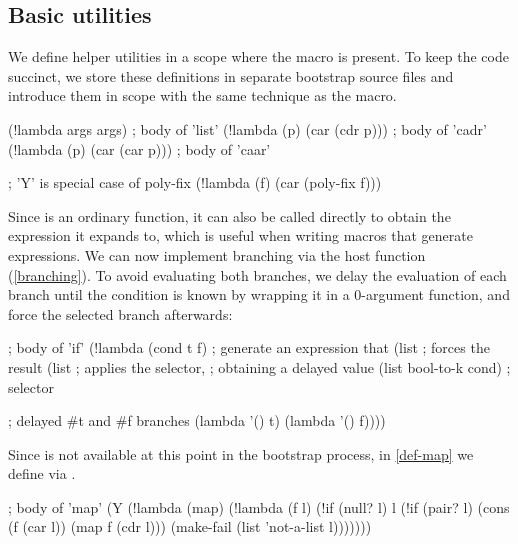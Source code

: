 \subsection{Basic utilities}
We define helper utilities in a scope where the  macro is present.
To keep the code succinct, we store these definitions in separate bootstrap
source files and introduce them in scope with the same technique as the
 macro.
\begin{listingbox}\begin{ildcode}
(!lambda args args)         ; body of 'list'
(!lambda (p) (car (cdr p))) ; body of 'cadr'
(!lambda (p) (car (car p))) ; body of 'caar'

; 'Y' is special case of poly-fix
(!lambda (f) (car (poly-fix f)))
\end{ildcode}\end{listingbox}
Since  is an ordinary function, it can also be called directly
to obtain the expression it expands to, which is useful when writing macros
that generate  expressions.
We can now implement branching via the  host
function (\cref{branching}).
To avoid evaluating both branches, we delay the evaluation of
each branch until the condition is known by wrapping it in a 0-argument
function, and force the selected branch afterwards:
\begin{listingbox}\begin{ildcode}
; body of 'if'
(!lambda (cond t f)
  ; generate an expression that
  (list     ; forces the result
    (list   ; applies the selector,
            ; obtaining a delayed value
      (list bool-to-k cond) ; selector

      ; delayed #t and #f branches
      (lambda '() t)
      (lambda '() f))))
\end{ildcode}\end{listingbox}
\label{if}
Since  is not available at this point in the bootstrap process,
in \cref{def-map} we define  via .
\begin{listingbox}\begin{ildcode}
; body of 'map'
(Y (!lambda (map)
  (!lambda (f l)
    (!if (null? l)
      l
      (!if (pair? l)
        (cons
          (f (car l)) (map f (cdr l)))
        (make-fail
          (list 'not-a-list l)))))))
\end{ildcode}\end{listingbox}
\label{def-map}

